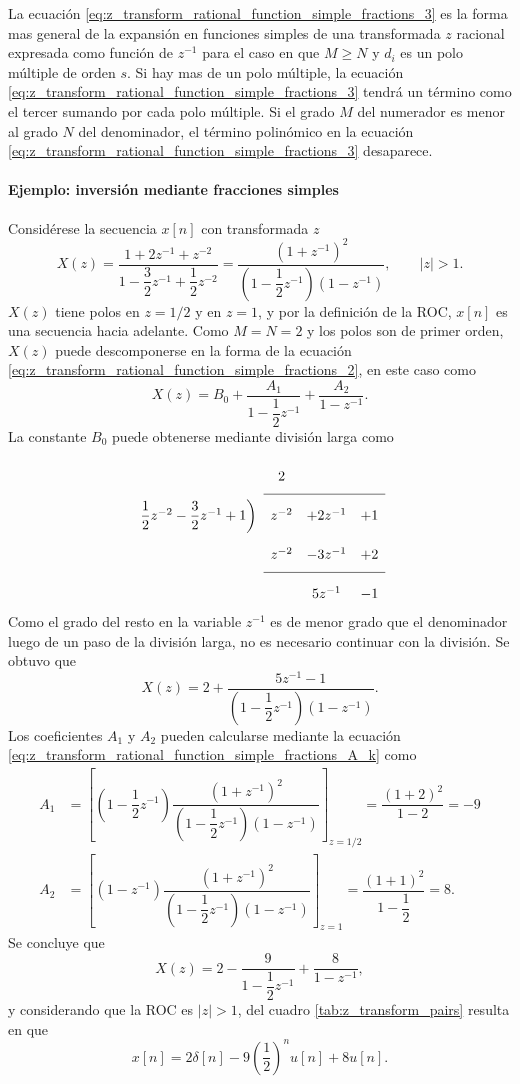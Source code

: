 \documentclass[a4paper]{report}
\begin{document}
La ecuación \ref{eq:z_transform_rational_function_simple_fractions_3} es la forma mas general de la expansión en funciones simples de una transformada \(z\) racional expresada como función de \(z^{-1}\) para el caso en que \(M\geq N\) y \(d_i\) es un polo múltiple de orden \(s\). Si hay mas de un polo múltiple, la ecuación \ref{eq:z_transform_rational_function_simple_fractions_3} tendrá un término como el tercer sumando por cada polo múltiple. Si el grado \(M\) del numerador es menor al grado \(N\) del denominador, el término polinómico en la ecuación \ref{eq:z_transform_rational_function_simple_fractions_3} desaparece.
 
\paragraph{Ejemplo: inversión mediante fracciones simples} Considérese la secuencia \(x[n]\) con transformada \(z\)
\[
 X(z)=\dfrac{1+2z^{-1}+z^{-2}}{1-\dfrac{3}{2}z^{-1}+\dfrac{1}{2}z^{-2}}
  =\dfrac{(1+z^{-1})^2}{\left(1-\dfrac{1}{2}z^{-1}\right)\left(1-z^{-1}\right)},
  \qquad 
  |z|>1.
\]
\(X(z)\) tiene polos en \(z=1/2\) y en \(z=1\), y por la definición de la ROC, \(x[n]\) es una secuencia hacia adelante. Como \(M=N=2\) y los polos son de primer orden, \(X(z)\) puede descomponerse en la forma de la ecuación \ref{eq:z_transform_rational_function_simple_fractions_2}, en este caso como
\[
 X(z)=B_0+\dfrac{A_1}{1-\dfrac{1}{2}z^{-1}}+\dfrac{A_2}{1-z^{-1}}.
\]
La constante \(B_0\) puede obtenerse mediante división larga como
\[
\setlength\extrarowheight{10pt}
\begin{array}[t]{cccc}
                       & 2 &   &    \\[\medskipamount]
\cline{2-4}
\dfrac{1}{2}z^{-2}-\dfrac{3}{2}z^{-1}+1 
                \bigg) & z^{-2} & +2z^{-1} & +1 \\
                       & z^{-2} & -3z^{-1} & +2  \\[\medskipamount]
\cline{2-4}
                       &    & 5z^{-1} & -1  
\end{array}
\]
Como el grado del resto en la variable \(z^{-1}\) es de menor grado que el denominador luego de un paso de la división larga, no es necesario continuar con la división. Se obtuvo que 
\[
 X(z)=2+\dfrac{5z^{-1}-1}{\left(1-\dfrac{1}{2}z^{-1}\right)\left(1-z^{-1}\right)}.
\]
Los coeficientes \(A_1\) y \(A_2\) pueden calcularse mediante la ecuación \ref{eq:z_transform_rational_function_simple_fractions_A_k} como
\begin{align*}
 A_1&=\left[\left(1-\dfrac{1}{2}z^{-1}\right)\dfrac{(1+z^{-1})^2}{\left(1-\dfrac{1}{2}z^{-1}\right)\left(1-z^{-1}\right)}\right]_{z=1/2}=\dfrac{(1+2)^2}{1-2}=-9\\
 A_2&=\left[\left(1-z^{-1}\right)\dfrac{(1+z^{-1})^2}{\left(1-\dfrac{1}{2}z^{-1}\right)\left(1-z^{-1}\right)}\right]_{z=1}=\dfrac{(1+1)^2}{1-\dfrac{1}{2}}=8.
\end{align*}
Se concluye que 
\[
 X(z)=2-\dfrac{9}{1-\dfrac{1}{2}z^{-1}}+\dfrac{8}{1-z^{-1}},
\]
y considerando que la ROC es \(|z|>1\), del cuadro \ref{tab:z_transform_pairs} resulta en que 
\[
 x[n]=2\delta[n]-9\left(\frac{1}{2}\right)^nu[n]+8u[n].
\]
\end{document}
